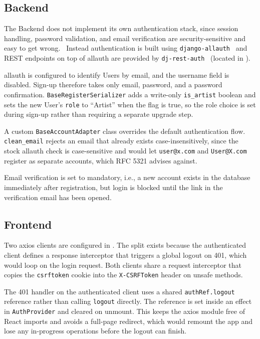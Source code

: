 \subsection{Backend}
The Backend does not implement its own authentication
stack, since session handling, password validation, and email verification
are security-sensitive and easy to get wrong.~\parencite{dont_write_your_own_auth}
Instead authentication is built using \texttt{django-allauth}~\parencite{django_allauth} and REST endpoints
on top of allauth are provided by
\texttt{dj-rest-auth}~\parencite{dj_rest_auth} (located in ).

allauth is configured to identify Users by email, and the username
field is disabled. Sign-up therefore takes only email, password, and
a password confirmation. \texttt{BaseRegisterSerializer} adds a write-only
\texttt{is\_artist} boolean and sets the new User's \texttt{role} to
``Artist'' when the flag is true, so the role choice is set during
sign-up rather than requiring a separate upgrade step.

A custom \texttt{BaseAccountAdapter} class overrides the default
authentication flow. \texttt{clean\_email} rejects an email that
already exists case-insensitively, since the stock allauth check is
case-sensitive and would let \texttt{user@x.com} and
\texttt{User@X.com} register as separate accounts, which RFC 5321
advises against.~\parencite{rfc5321}

Email verification is set to mandatory, i.e., a new account
exists in the database immediately after registration, but
login is blocked until the link in the verification email has been
opened.

\subsection{Frontend}
Two axios clients are configured in
. The split exists
because the authenticated client defines a response interceptor that
triggers a global logout on 401, which would loop on the login request.
Both clients share a request interceptor that copies the
\texttt{csrftoken} cookie into the \texttt{X-CSRFToken} header on
unsafe methods.

The 401 handler on the authenticated client uses a shared
\texttt{authRef.logout} reference rather than calling \texttt{logout}
directly. The reference is set inside an effect in
\texttt{AuthProvider} and cleared on unmount. This keeps the axios
module free of React imports and avoids a full-page redirect, which
would remount the app and lose any in-progress operations before the
logout can finish.

